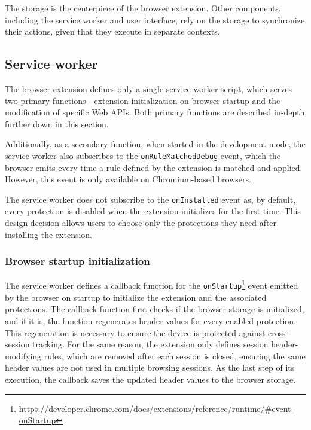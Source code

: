 The storage is the centerpiece of the browser extension. Other components, including the service worker and user interface, rely on the storage to synchronize their actions, given that they execute in separate contexts.

\subsection{Service worker}

The browser extension defines only a single service worker script, which serves two primary functions - extension initialization on browser startup and the modification of specific Web APIs. Both primary functions are described in-depth further down in this section.

Additionally, as a secondary function, when started in the development mode, the service worker also subscribes to the \texttt{onRuleMatchedDebug} event, which the browser emits every time a rule defined by the extension is matched and applied. However, this event is only available on Chromium-based browsers.

The service worker does not subscribe to the \texttt{onInstalled} event as, by default, every protection is disabled when the extension initializes for the first time. This design decision allows users to choose only the protections they need after installing the extension.

\subsubsection{Browser startup initialization}
\label{SubSubSection:StartupInitialization}

The service worker defines a callback function for the \texttt{onStartup}\footnote{\url{https://developer.chrome.com/docs/extensions/reference/runtime/\#event-onStartup}} event emitted by the browser on startup to initialize the extension and the associated protections. The callback function first checks if the browser storage is initialized, and if it is, the function regenerates header values for every enabled protection. This regeneration is necessary to ensure the device is protected against cross-session tracking. For the same reason, the extension only defines session header-modifying rules, which are removed after each session is closed, ensuring the same header values are not used in multiple browsing sessions. As the last step of its execution, the callback saves the updated header values to the browser storage.

